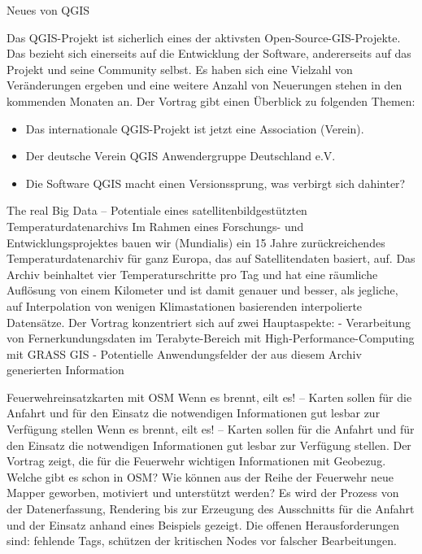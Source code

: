 %
{Neues von QGIS}%
{}%
{Das QGIS-Projekt ist sicherlich eines der aktivsten Open-Source-GIS-Projekte.
Das bezieht sich einerseits auf die Entwicklung der Software,
andererseits auf das Projekt und seine Community selbst. Es haben sich eine
Vielzahl von Veränderungen ergeben und eine weitere Anzahl von Neuerungen
stehen in den kommenden Monaten an. Der Vortrag gibt einen Überblick zu folgenden Themen:
\begin{itemize}\setlength\itemsep{-1pt}
\item Das internationale QGIS-Projekt ist jetzt eine Association (Verein).
\item Der deutsche Verein QGIS Anwendergruppe Deutschland e.V.
\item Die Software QGIS macht einen Versionssprung, was verbirgt sich dahinter?
\end{itemize}%
}

%
{The real Big Data – Potentiale eines satellitenbildgestützten Temperaturdatenarchivs}%
{}%
{Im Rahmen eines Forschungs- und Entwicklungsprojektes bauen wir (Mundialis) ein 15 Jahre
  zurückreichendes Temperaturdatenarchiv für ganz Europa, das auf Satellitendaten basiert, auf.
  Das Archiv beinhaltet vier Temperaturschritte pro Tag und hat eine räumliche Auflösung von einem
  Kilometer und ist damit genauer und besser, als jegliche, auf Interpolation von wenigen
  Klimastationen basierenden interpolierte Datensätze.
  Der Vortrag konzentriert sich auf zwei Hauptaspekte:
  - Verarbeitung von Fernerkundungsdaten im Terabyte-Bereich mit High-Performance-Computing mit
  GRASS GIS
- Potentielle Anwendungsfelder der aus diesem Archiv generierten Information}

%
{Feuerwehreinsatzkarten mit OSM}%
{Wenn es brennt, eilt es! – Karten sollen für die Anfahrt und für den Einsatz die notwendigen
Informationen gut lesbar zur Verfügung stellen}%
{Wenn es brennt, eilt es! -- Karten sollen für die
  Anfahrt und für den Einsatz die notwendigen Informationen gut lesbar zur Verfügung stellen.
Der Vortrag zeigt, die für die Feuerwehr wichtigen Informationen mit Geobezug. Welche gibt es schon
in OSM? Wie können aus der Reihe der Feuerwehr neue Mapper geworben, motiviert und unterstützt
werden?  Es wird der Prozess von der Datenerfassung, Rendering bis zur Erzeugung des Ausschnitts für
die
Anfahrt und der Einsatz anhand eines Beispiels gezeigt. Die offenen Herausforderungen sind: fehlende
Tags, schützen der kritischen Nodes vor falscher Bearbeitungen.}

